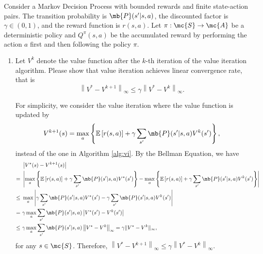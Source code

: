 \begin{exercise}\label{exercise:ValueIteration}
    Consider a Markov Decision Process with bounded rewards and finite state-action pairs. The transition probability is $\mb{P}(s'|s,a)$, the discounted factor is $\gamma\in (0,1)$, and the reward function is $r(s,a)$. Let $\pi:\mc{S}\rightarrow\mc{A}$ be a deterministic policy and $Q^\pi (s,a)$ be the accumulated reward by performing the action $a$ first and then following the policy $\pi$.


    \begin{enumerate}
        \item Let $V^k$ denote the value function after the $k$-th iteration of the value iteration algorithm. Please show that value iteration achieves linear convergence rate, that is
            $$ \left\|V^* - V^{k+1}\right\|_\infty \leq \gamma \left\|V^* - V^k \right\|_\infty.$$
            \begin{solution}
                For simplicity, we consider the value iteration where the value function is updated by
                \begin{align*}
                    V^{k+1}(s) = \max_{a}\left\{\mathbb{E}\left[r(s,a)\right] + \gamma\sum_{s'}\mb{P}(s'|s,a)V^k(s')\right\},
                \end{align*}
                instead of the one in Algorithm \ref{alg:vi}.
                By the Bellman Equation, we have
                \begin{align*}
                           & \left|V^*(s) - V^{k+1}(s)\right|                                                                                                                                                                               \\
                    =\     & \left| \max_{a}\left\{ \mathbb{E}\left[r(s,a)\right] + \gamma \sum_{s'}\mb{P}(s'|s,a)V^*(s') \right\} - \max_{a}\left\{ \mathbb{E}\left[r(s,a)\right] + \gamma \sum_{s'}\mb{P}(s'|s,a)V^k(s') \right\} \right| \\
                    \le \  & \max_{a}\left| \gamma \sum_{s'}\mb{P}(s'|s,a)V^*(s') - \gamma \sum_{s'}\mb{P}(s'|s,a)V^k(s') \right|                                                                                                           \\
                    = \    & \gamma \max_{a} \sum_{s'} \mb{P}(s'|s,a) \left| V^*(s') - V^k(s') \right|                                                                                                                                      \\
                    \le \  & \gamma \max_{a} \sum_{s'} \mb{P}(s'|s,a) \left\| V^* - V^k \right\|_\infty = \gamma \|V^* - V^k\|_\infty,
                \end{align*}
                for any $s\in\mc{S}$. Therefore, $\left\|V^* - V^{k+1}\right\|_\infty \leq \gamma \left\|V^* - V^k \right\|_\infty$.
                \qedhere
            \end{solution}


\end{enumerate}
\end{exercise}

